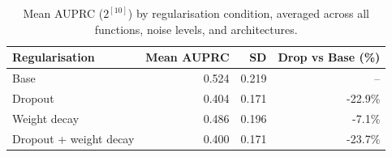 \begin{table}[ht]
\centering
\caption{Mean AUPRC ($2^{[10]}$) by regularisation condition, averaged across all functions, noise levels, and architectures.}
\label{tab:auprc_by_regularization}
\begin{tabular}{lrrr}
\toprule
Regularisation & Mean AUPRC & SD & Drop vs Base (\%) \\
\midrule
Base & 0.524 & 0.219 & -- \\
Dropout & 0.404 & 0.171 & -22.9\% \\
Weight decay & 0.486 & 0.196 & -7.1\% \\
Dropout + weight decay & 0.400 & 0.171 & -23.7\% \\
\bottomrule
\end{tabular}
\end{table}